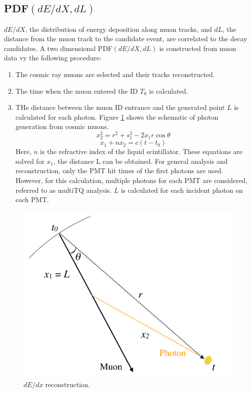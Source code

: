 \subsection*{PDF$(dE/dX,dL)$}
$dE/dX$, the distribution of energy deposition along muon tracks, and $dL$, the distance from the muon track to the candidate event, are correlated to the decay candidates. A two dimensional PDF$(dE/dX,dL)$ is constructed from muon data vy the following procedure:
\begin{enumerate}
	\item The cosmic ray muons are selected and their tracks reconstructed.
	\item The time when the muon entered the ID $T_0$ is calculated.
	\item THe distance between the muon ID entrance and the generated point $L$ is calculated for each photon. Figure \ref{fig:showerphoton} shows the schematic of photon generation from cosmic muons. 
	\begin{equation}
		x^2_2=r^2+s^2_1-2x_1r\cos\theta
	\end{equation}
	\begin{equation}
		x_1+nx_2=c(t-t_0)
	\end{equation}
	Here, $n$ is the refractive index of the liquid scintillator. These equations are solved for $x_1$, the distance L can be obtained. For general analysis and reconstruction, only the PMT hit times of the first photons are used. However, for this calculation, multiple photons for each PMT are considered, referred to as multiTQ analysis. $L$ is calculated for each incident photon on each PMT. 
\end{enumerate}

\begin{figure}[htb]
	\centering
	\includegraphics[scale=0.35]{showerphoton.png}
	\caption{$dE/dx$ reconstruction.}
	\label{fig:showerphoton}
\end{figure}

